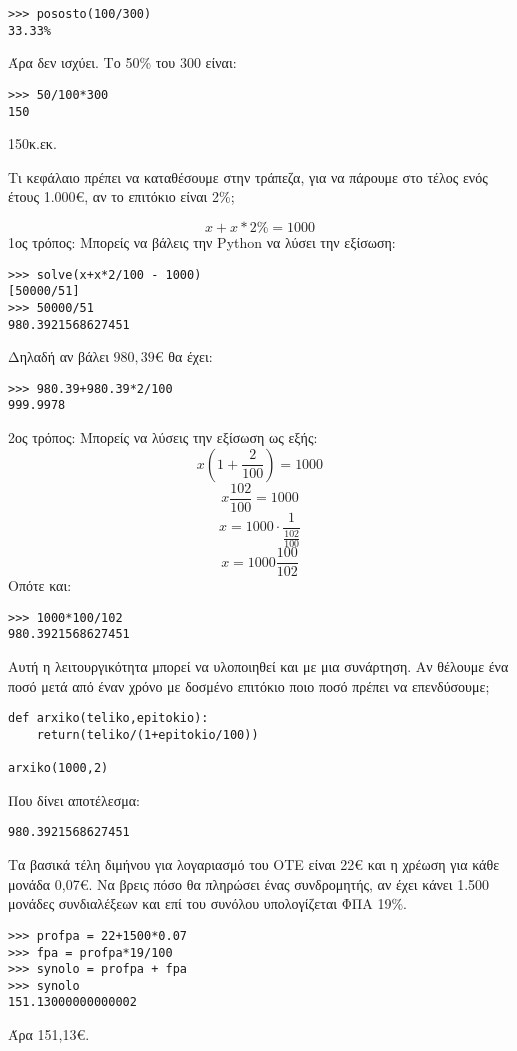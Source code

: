 \begin{lstlisting}
>>> pososto(100/300)
33.33%
\end{lstlisting}
Άρα δεν ισχύει. Το 50\% του 300 είναι:
\begin{lstlisting}
>>> 50/100*300
150
\end{lstlisting}
150κ.εκ.
\begin{exercise}
Τι κεφάλαιο πρέπει να καταθέσουμε στην τράπεζα, για να πάρουμε στο
τέλος ενός έτους 1.000€, αν το επιτόκιο είναι 2\%;
\end{exercise}
$$ x + x*2\% = 1000$$
1ος τρόπος:
Μπορείς να βάλεις την Python να λύσει την εξίσωση:
\begin{lstlisting}
>>> solve(x+x*2/100 - 1000)
[50000/51]
>>> 50000/51
980.3921568627451
\end{lstlisting}
Δηλαδή αν βάλει $980,39$€ θα έχει:
\begin{lstlisting}
>>> 980.39+980.39*2/100
999.9978
\end{lstlisting}
2ος τρόπος:
Μπορείς να λύσεις την εξίσωση ως εξής:
$$ x(1+\frac{2}{100}) = 1000$$
$$x\frac{102}{100}=1000$$
$$x = 1000\cdot\frac{1}{\frac{102}{100}}$$
$$x= 1000\frac{100}{102}$$
Οπότε και:
\begin{lstlisting}
>>> 1000*100/102
980.3921568627451
\end{lstlisting}

Αυτή η λειτουργικότητα μπορεί να υλοποιηθεί και με μια συνάρτηση. Αν θέλουμε ένα ποσό μετά από έναν χρόνο με δοσμένο επιτόκιο  ποιο ποσό πρέπει να επενδύσουμε;
\begin{lstlisting}
def arxiko(teliko,epitokio):
    return(teliko/(1+epitokio/100))

arxiko(1000,2)
\end{lstlisting}
Που δίνει αποτέλεσμα:
\begin{lstlisting}
980.3921568627451
\end{lstlisting}
\begin{exercise}
Τα βασικά τέλη διμήνου για λογαριασμό του ΟΤΕ είναι 22€ και η χρέωση για
κάθε μονάδα 0,07€. Να βρεις πόσο θα πληρώσει ένας συνδρομητής, αν έχει
κάνει 1.500 μονάδες συνδιαλέξεων και επί του συνόλου υπολογίζεται ΦΠΑ 19\%.
\end{exercise}
\begin{lstlisting}
>>> profpa = 22+1500*0.07
>>> fpa = profpa*19/100
>>> synolo = profpa + fpa
>>> synolo
151.13000000000002
\end{lstlisting}
Άρα 151,13€.